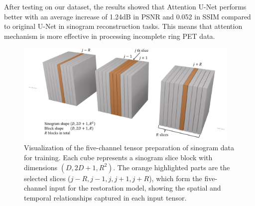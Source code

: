 \documentclass[12pt]{iopart}
\begin{document}

After testing on our dataset, the results showed that Attention U-Net performs better with an average increase of 1.24dB in PSNR and 0.052 in SSIM compared to original U-Net in sinogram reconstruction tasks. This means that attention mechanism is more effective in processing incomplete ring PET data.



\begin{figure}[htbp]
\centering
\vspace{-.3cm}
\includegraphics[width=0.96\textwidth]{Images/slices.pdf}
\vspace{-.3cm}
\caption{Visualization of the five-channel tensor preparation of sinogram data for training. Each cube represents a sinogram slice block with dimensions $(D, 2D+1, R^2)$. The orange highlighted parts are the selected slices ($j-R, j-1, j, j+1, j+R$), which form the five-channel input for the restoration model, showing the spatial and temporal relationships captured in each input tensor.}
\label{fig:sinogram_structure}
\end{figure}


\end{document}
